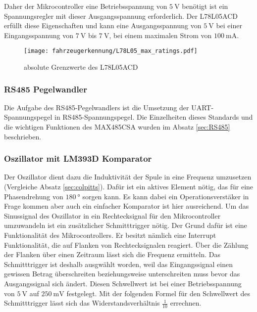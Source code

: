Daher der Mikrocontroller eine Betriebsspannung von $\SI{5}{\volt}$ benötigt ist ein Spannungsregler mit dieser Ausgangsspannung erforderlich. Der L78L05ACD erfüllt diese Eigenschaften und kann 
eine Ausgangsspannung von $\SI{5}{\volt}$ bei einer Eingangsspannung von $\SI{7}{\volt}$ bis $\SI{7}{\volt}$, bei einem maximalen Strom von $\SI{100}{\milli\ampere}$.

\begin{figure}[H]
    \centering
    \texttt{[image: fahrzeugerkennung/L78L05\_max\_ratings.pdf]}
    \caption{absolute Grenzwerte des L78L05ACD}
\end{figure}

\subsubsection{RS485 Pegelwandler}

Die Aufgabe des RS485-Pegelwandlers ist die Umsetzung der UART-Spannungspegel in RS485-Spannungspegel. Die Einzelheiten dieses Standards und die wichtigen Funktionen des MAX485CSA 
wurden im Absatz \ref{sec:RS485} beschrieben.

\subsubsection{Oszillator mit LM393D Komparator}

Der Oszillator dient dazu die Induktivität der Spule in eine Frequenz umzusetzen (Vergleiche Absatz \ref{sec:colpitts}). Dafür ist ein aktives Element nötig, das für eine Phasendrehung von $\SI{180}{\degree}$ sorgen kann.
Es kann dabei ein Operationsverstäker in Frage kommen aber auch ein einfacher Komparator ist hier ausreichend. Um das Sinussignal des Oszillator in ein Rechtecksignal für den Mikrocontroller umzuwandeln ist ein zusätzlicher Schmitttrigger nötig.
Der Grund dafür ist eine Funktionalität des Mikrocontrollers. Er besitzt nämlich eine Interrupt Funktionalität, die auf Flanken von Rechtecksignalen reagiert. Über die Zählung der Flanken über einen Zeitraum lässt sich die Frequenz ermitteln.
Das Schmitttrigger ist deshalb ausgwählt worden, weil das Eingangssignal einen gewissen Betrag überschreiten beziehungsweise unterschreiten muss bevor das Ausgangssignal sich ändert. Diesen Schwellwert ist bei einer Betriebsspannung von $\SI{5}{\volt}$
auf $\SI{250}{\milli\volt}$ festgelegt. Mit der folgenden Formel für den Schwellwert des Schmitttrigger lässt sich das Widerstandsverhältnis $\frac{1}{10}$ errechnen.

